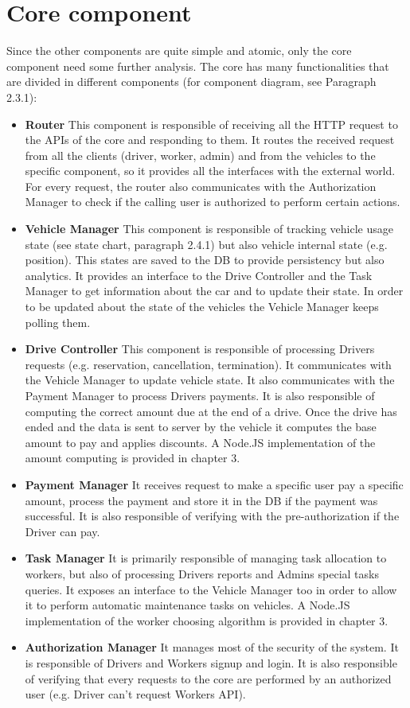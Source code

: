 \section {Core component}
Since the other components are quite simple and atomic, only the core component need some further analysis. The core has many functionalities that are divided in different components (for component diagram, see Paragraph 2.3.1):
\begin{itemize}
\item \textbf{Router} This component is responsible of receiving all the HTTP request to the APIs of the core and responding to them. It routes the received request from all the clients (driver, worker, admin) and from the vehicles to the specific component, so it provides all the interfaces with the external world. For every request, the router also communicates with the Authorization Manager to check if the calling user is authorized to perform certain actions.
\item \textbf{Vehicle Manager} This component is responsible of tracking vehicle usage state (see state chart, paragraph 2.4.1) but also vehicle internal state (e.g. position). This states are saved to the DB to provide persistency but also analytics. It provides an interface to the Drive Controller and the Task Manager to get information about the car and to update their state. In order to be updated about the state of the vehicles the Vehicle Manager keeps polling them.
\item \textbf{Drive Controller} This component is responsible of processing Drivers requests (e.g. reservation, cancellation, termination). It communicates with the Vehicle Manager to update vehicle state. It also communicates with the Payment Manager to process Drivers payments. It is also responsible of computing the correct amount due at the end of a drive. Once the drive has ended and the data is sent to server by the vehicle it computes the base amount to pay and applies discounts. A Node.JS implementation of the amount computing is provided in chapter 3.
\item \textbf{Payment Manager} It receives request to make a specific user pay a specific amount, process the payment and store it in the DB if the payment was successful. It is also responsible of verifying with the pre-authorization if the Driver can pay. 
\item \textbf{Task Manager} It is primarily responsible of managing task allocation to workers, but also of processing Drivers reports and Admins special tasks queries. It exposes an interface to the Vehicle Manager too in order to allow it to perform automatic maintenance tasks on vehicles. A Node.JS implementation of the worker choosing algorithm is provided in chapter 3.
\item \textbf{Authorization Manager} It manages most of the security of the system. It is responsible of Drivers and Workers signup and login. It is also responsible of verifying that every requests to the core are performed by an authorized user (e.g. Driver can't request Workers API). 
\end{itemize}

